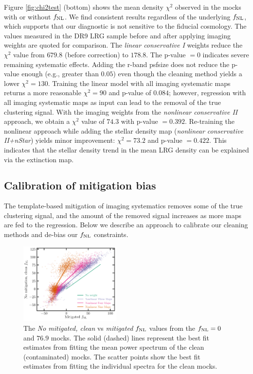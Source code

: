Figure \ref{fig:chi2test} (bottom) shows the mean density $\chi^{2}$ observed in the mocks with or without $f_{\rm NL}$. We find consistent results regardless of the underlying $f_{\rm NL}$, which supports that our diagnostic is not sensitive to the fiducial cosmology. The values measured in the DR9 LRG sample before and after applying imaging weights are quoted for comparison. The \textit{linear conservative I} weights reduce the $\chi^{2}$ value from $679.8$ (before correction) to $178.8$. The p-value $=0$ indicates severe remaining systematic effects. Adding the r-band psfsize does not reduce the p-value enough (e.g., greater than $0.05$) even though the cleaning method yields a lower $\chi^{2}=130$. Training the linear model with all imaging systematic maps returns a more reasonable $\chi^{2}=90$ and p-value of $0.084$; however, regression with all imaging systematic maps as input can lead to the removal of the true clustering signal. With the imaging weights from the \textit{nonlinear conservative II} approach, we obtain a $\chi^{2}$ value of $74.3$ with p-value $=0.392$. Re-training the nonlinear approach while adding the stellar density map (\textit{nonlinear conservative II+nStar}) yields minor improvement: $\chi^{2}=73.2$ and p-value $=0.422$.  This indicates that the stellar density trend in the mean LRG density can be explained via the extinction map.



\subsection{Calibration of mitigation bias}\label{ssec:calibration}
The template-based mitigation of imaging systematics removes some of the true clustering signal, and the amount of the removed signal increases as more maps are fed to the regression. Below we describe an approach to calibrate our cleaning methods and de-bias our $f_{\rm NL}$ constraints. 

\begin{figure}
\centering
\includegraphics[width=0.45\textwidth]{figures/fnlbias}
\caption{The \textit{No mitigated, clean} vs \textit{mitigated} $f_{\rm NL}$ values from the $f_{\rm NL}=0$ and $76.9$ mocks. The solid (dashed) lines represent the best fit estimates from fitting the mean power spectrum of the clean (contaminated) mocks. The scatter points show the best fit estimates from fitting the individual spectra for the clean mocks.}\label{fig:fnlbias}
\end{figure}

